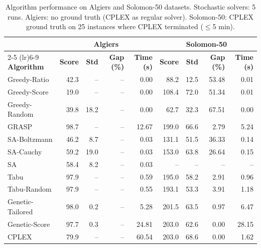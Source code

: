 \begin{table}[htbp]
\centering
\caption{Algorithm performance on Algiers and Solomon-50 datasets. Stochastic solvers: 5 runs. Algiers: no ground truth (CPLEX as regular solver). Solomon-50: CPLEX ground truth on 25 instances where CPLEX terminated ($\leq$5 min).}
\label{tab:results_algiers_s50}
\footnotesize
\setlength{\tabcolsep}{3.5pt}
\begin{tabular}{l rrrr rrrr}
\toprule
& \multicolumn{4}{c}{\textbf{Algiers}}
& \multicolumn{4}{c}{\textbf{Solomon-50}} \\
\cmidrule(lr){2-5} \cmidrule(lr){6-9}
\textbf{Algorithm}
& \textbf{Score} & \textbf{Std} & \textbf{Gap (\%)} & \textbf{Time (s)}
& \textbf{Score} & \textbf{Std} & \textbf{Gap (\%)} & \textbf{Time (s)} \\
\midrule
  Greedy-Ratio & 42.3 & -- & -- & 0.00 & 88.2 & 12.5 & 53.48 & 0.01 \\
  Greedy-Score & 19.0 & -- & -- & 0.00 & 108.4 & 72.0 & 51.34 & 0.01 \\
  Greedy-Random & 39.8 & 18.2 & -- & 0.00 & 62.7 & 32.3 & 67.51 & 0.00 \\
  GRASP & 98.7 & -- & -- & 12.67 & 199.0 & 66.6 & 2.79 & 5.24 \\
  SA-Boltzmann & 46.2 & 8.7 & -- & 0.03 & 131.1 & 51.5 & 36.33 & 0.14 \\
  SA-Cauchy & 59.2 & 19.0 & -- & 0.03 & 153.0 & 63.8 & 26.64 & 0.15 \\
  SA & 58.4 & 8.2 & -- & 0.03 & -- & -- & -- & -- \\
  Tabu & 97.9 & -- & -- & 0.59 & 195.0 & 58.2 & 2.91 & 0.96 \\
  Tabu-Random & 97.9 & -- & -- & 0.55 & 193.1 & 53.3 & 3.91 & 1.18 \\
  Genetic-Tailored & 98.0 & 0.2 & -- & 5.28 & 201.5 & 63.5 & 0.97 & 6.47 \\
  Genetic-Score & 97.7 & 0.3 & -- & 24.81 & 203.0 & 62.6 & 0.00 & 28.15 \\
  CPLEX & 79.9 & -- & -- & 60.54 & 203.0 & 68.6 & 0.00 & 1.62 \\
\bottomrule
\end{tabular}
\end{table}